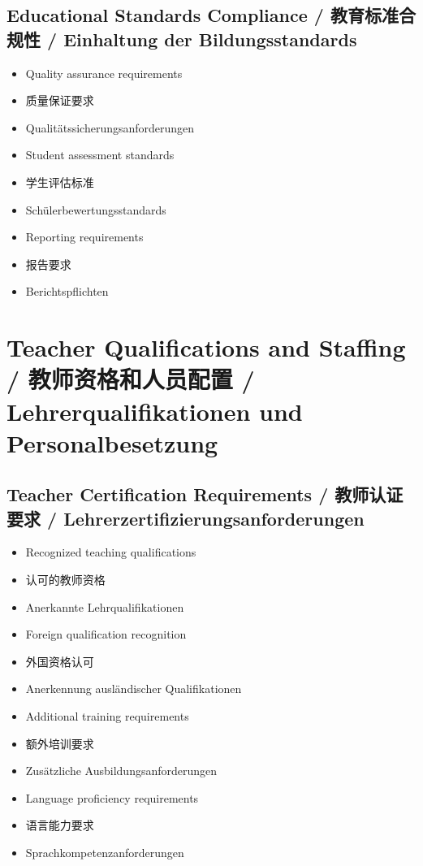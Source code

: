 \subsection{Educational Standards Compliance / 教育标准合规性 / Einhaltung der Bildungsstandards}
\begin{itemize}
    \item Quality assurance requirements
    \item 质量保证要求
    \item Qualitätssicherungsanforderungen
    \item Student assessment standards
    \item 学生评估标准
    \item Schülerbewertungsstandards
    \item Reporting requirements
    \item 报告要求
    \item Berichtspflichten
\end{itemize}

\section{Teacher Qualifications and Staffing / 教师资格和人员配置 / Lehrerqualifikationen und Personalbesetzung}

\subsection{Teacher Certification Requirements / 教师认证要求 / Lehrerzertifizierungsanforderungen}
\begin{itemize}
    \item Recognized teaching qualifications
    \item 认可的教师资格
    \item Anerkannte Lehrqualifikationen
    \item Foreign qualification recognition
    \item 外国资格认可
    \item Anerkennung ausländischer Qualifikationen
    \item Additional training requirements
    \item 额外培训要求
    \item Zusätzliche Ausbildungsanforderungen
    \item Language proficiency requirements
    \item 语言能力要求
    \item Sprachkompetenzanforderungen
\end{itemize}

